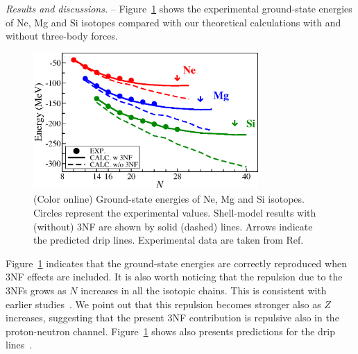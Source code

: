 \documentclass[aps,prl,twocolumn,groupedaddress,showkeys,showpacs,floatfix,superscriptaddress]{revtex4-1}
\newcommand\+{^\dagger}
\begin{document}
{\it Results and discussions.} --  Figure~\ref{fig:GE} shows the experimental ground-state energies of Ne, Mg and Si isotopes compared with our theoretical calculations with and without three-body forces.

\begin{figure}[tbh]
 \includegraphics[width=8.5725cm,angle=0,clip]{Fig1.eps}
 \caption{(Color online)
 Ground-state energies of Ne, Mg and Si isotopes. Circles represent the experimental
 values.   Shell-model results with (without) 3NF are shown by 
 solid (dashed) lines.
 Arrows indicate the predicted drip lines.
 Experimental data are taken from
 Ref.~\cite{NationalNuclearDataCenter:2008tv}}
 \label{fig:GE}
\end{figure}

Figure~\ref{fig:GE} indicates that the ground-state energies are correctly reproduced 
when 3NF effects are included.
It is also worth noticing that the repulsion due to the 3NFs
grows as $N$ increases in all the isotopic chains. This is 
consistent with earlier studies~\cite{PhysRevLett.105.032501,Holt:2014uc}.
We point out that this repulsion becomes stronger also as $Z$ increases,
suggesting that the present 3NF contribution is repulsive also in the proton-neutron 
channel. 
Figure~\ref{fig:GE} shows also presents predictions for the drip lines~\cite{koura2005,Erler:2012cc}.
\end{document}
